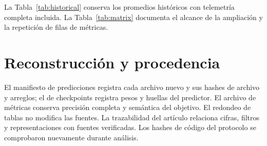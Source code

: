 \begin{table}[!t]
\caption{Historias semihorarias con objetivos comunes y horizonte treinta minutos (CPU a la izquierda y memoria a la derecha). Diseño estrella descriptivo.}\label{tab:history}
\centering\footnotesize

\setlength{\tabcolsep}{4pt}
\begin{minipage}[t]{.485\textwidth}
\centering\FitTable{}
\end{minipage}
\hfill
\begin{minipage}[t]{.485\textwidth}
\centering\FitTable{}
\end{minipage}
\end{table}
\begin{table}[!t]
\caption{Transferencia Alibaba, seis condiciones con pérdidas. MAE/RMSE absolutos utilizan normalización publicada de ambos recursos, no núcleos o bytes.}\label{tab:external}
\centering\footnotesize
\FitTable{}
\end{table}
La Tabla~\ref{tab:historical} conserva los promedios históricos con telemetría completa incluida. La Tabla~\ref{tab:matrix} documenta el alcance de la ampliación y la repetición de filas de métricas.
\begin{table}[!t]
\caption{Resumen histórico de las siete condiciones originales, incluida telemetría completa. Su alcance difiere de la tabla histórica principal de seis condiciones con pérdidas. V2 es alias y el extremo GinAR se conserva.}\label{tab:historical}
\centering\footnotesize
\FitTable{}
\end{table}
\begin{table}[!t]
\caption{Matriz de métricas ejecutadas. Las filas repiten resúmenes por modelo, semilla, máscara, condición y servicio; no son datasets independientes.}\label{tab:matrix}
\centering\footnotesize
\FitTable{}
\end{table}
\section{Reconstrucción y procedencia}
El manifiesto de predicciones registra cada archivo nuevo y sus hashes de archivo y arreglos; el de checkpoints registra pesos y huellas del predictor. El archivo de métricas conserva precisión completa y semántica del objetivo. El redondeo de tablas no modifica las fuentes. La trazabilidad del artículo relaciona cifras, filtros y representaciones con fuentes verificadas. Los hashes de código del protocolo se comprobaron nuevamente durante análisis.

